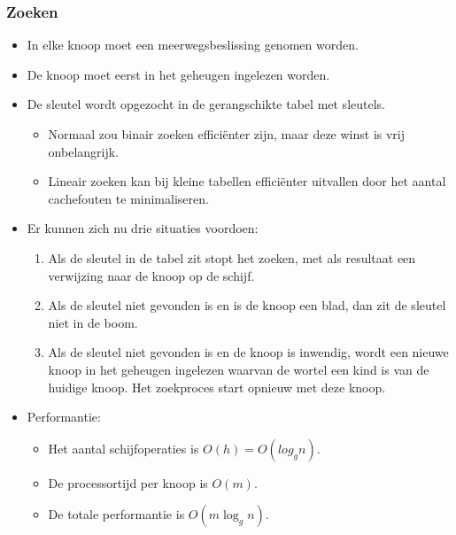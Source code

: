 \subsubsection{Zoeken}
\begin{itemize}
    \item In elke knoop moet een meerwegsbeslissing genomen worden.
    \item De knoop moet eerst in het geheugen ingelezen worden.
    \item De sleutel wordt opgezocht in de gerangschikte tabel met sleutels.
    \begin{itemize}
        \item Normaal zou binair zoeken efficiënter zijn, maar deze winst is vrij onbelangrijk.
        \item Lineair zoeken kan bij kleine tabellen efficiënter uitvallen door het aantal cachefouten te minimaliseren.
    \end{itemize}
    \item Er kunnen zich nu drie situaties voordoen:
    \begin{enumerate}
        \item Als de sleutel in de tabel zit stopt het zoeken, met als resultaat een verwijzing naar de knoop op de schijf.
        \item Als de sleutel niet gevonden is en is de knoop een blad, dan zit de sleutel niet in de boom.
        \item Als de sleutel niet gevonden is en de knoop is inwendig, wordt een nieuwe knoop in het geheugen ingelezen waarvan de wortel een kind is van de huidige knoop. Het zoekproces start opnieuw met deze knoop.
    \end{enumerate}
    \item Performantie:
    \begin{itemize}
        \item Het aantal schijfoperaties is $O(h) = O(log_g n)$.
        \item De processortijd per knoop is $O(m)$.
        \item De totale performantie is $O(m\log_g n)$.
    \end{itemize}

\end{itemize}
